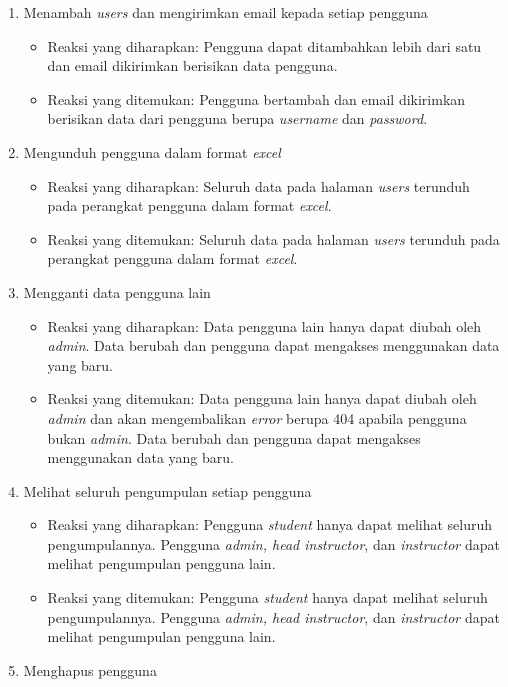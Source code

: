 \begin{enumerate}
\begin{itemize}
	 \end{itemize}
	 \item Menambah \textit{users} dan mengirimkan email kepada setiap pengguna
	 \begin{itemize}
	 	\item Reaksi yang diharapkan: Pengguna dapat ditambahkan lebih dari satu dan email dikirimkan berisikan data pengguna.
	 	\item Reaksi yang ditemukan: Pengguna bertambah dan email dikirimkan berisikan data dari pengguna berupa \textit{username} dan \textit{password}.
	 \end{itemize}
	 \item Mengunduh pengguna dalam format \textit{excel}
	 \begin{itemize}
	 	\item Reaksi yang diharapkan: Seluruh data pada halaman \textit{users} terunduh pada perangkat pengguna dalam format \textit{excel}.
	 	\item Reaksi yang ditemukan: Seluruh data pada halaman \textit{users} terunduh pada perangkat pengguna dalam format \textit{excel}.
	 \end{itemize}
	 \item Mengganti data pengguna lain
	 \begin{itemize}
	 	\item Reaksi yang diharapkan: Data pengguna lain hanya dapat diubah oleh \textit{admin}. Data berubah dan pengguna dapat mengakses menggunakan data yang baru.
	 	\item Reaksi yang ditemukan: Data pengguna lain hanya dapat diubah oleh \textit{admin} dan akan mengembalikan \textit{error} berupa 404 apabila pengguna bukan \textit{admin}. Data berubah dan pengguna dapat mengakses menggunakan data yang baru.
	 \end{itemize}
	 \item Melihat seluruh pengumpulan setiap pengguna
	 \begin{itemize}
	 	\item Reaksi yang diharapkan: Pengguna \textit{student} hanya dapat melihat seluruh pengumpulannya. Pengguna \textit{admin, head instructor}, dan \textit{instructor} dapat melihat pengumpulan pengguna lain.
	 	\item Reaksi yang ditemukan: Pengguna \textit{student} hanya dapat melihat seluruh pengumpulannya. Pengguna \textit{admin, head instructor}, dan \textit{instructor} dapat melihat pengumpulan pengguna lain.
	 \end{itemize}
	 \item Menghapus pengguna

\end{enumerate}
